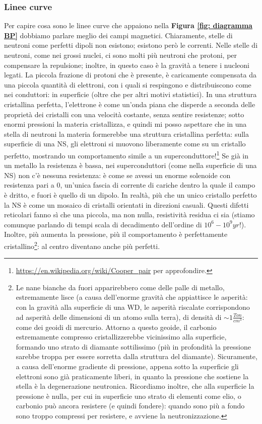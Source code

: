 \subsubsection{Linee curve}
Per capire cosa sono le linee curve che appaiono nella \textbf{Figura \ref{fig: diagramma BP}} dobbiamo parlare meglio dei campi magnetici.
Chiaramente, stelle di neutroni come perfetti dipoli non esistono; esistono però le correnti.
Nelle stelle di neutroni, come nei grossi nuclei, ci sono molti più neutroni che protoni, per compensare la repulsione; inoltre, in questo caso è la gravità a tenere i nucleoni legati.
La piccola frazione di protoni che è presente, è caricamente compensata da una piccola quantità di elettroni, con i quali si respingono e distribuiscono come nei conduttori: in superficie (oltre che per altri motivi statistici).
In una struttura cristallina perfetta, l'elettrone è come un'onda piana che disperde a seconda delle proprietà dei cristalli con una velocità costante, senza sentire resistenze; sotto enormi pressioni la materia cristallizza, e quindi mi posso aspettare che in una stella di neutroni la materia formerebbe una struttura cristallina perfetta: sulla superficie di una NS, gli elettroni si muovono liberamente come su un cristallo perfetto, mostrando un comportamento simile a un superconduttore!\footnote{\url{https://en.wikipedia.org/wiki/Cooper_pair} per approfondire.}
Se già in un metallo la resistenza è bassa, nei superconduttori (come nella superficie di una NS) non c'è nessuna resistenza: è come se avessi un enorme solenoide con resistenza pari a $0$, un'unica fascia di corrente di cariche dentro la quale il campo è dritto, e fuori è quello di un dipolo.
In realtà, più che un unico cristallo perfetto la NS è come un mosaico di cristalli orientati in direzioni casuali.
Questi difetti reticolari fanno sì che una piccola, ma non nulla, resistività residua ci sia (stiamo comunque parlando di tempi scala di decadimento dell'ordine di $10^6-10^9yr$!).
Inoltre, più aumenta la pressione, più il comportamento è perfettamente cristallino\footnote{Le nane bianche da fuori apparirebbero come delle palle di metallo, estremamente lisce (a causa dell'enorme gravità che appiattisce le asperità: con la gravità alla superficie di una WD, le asperità riscalate corrispondono ad asperità delle dimensioni di un atomo sulla terra), di densità di $\sim 1 \frac{Ton}{cm^3}$: come dei geoidi di mercurio.
Attorno a questo geoide, il carbonio estremamente compresso cristallizzerebbe vicinissimo alla superficie, formando uno strato di diamante sottilissimo (più in profondità la pressione sarebbe troppa per essere sorretta dalla struttura del diamante).
Sicuramente, a causa dell'enorme gradiente di pressione, appena sotto la superficie gli elettroni sono già praticamente liberi, in quanto la pressione che sostiene la stella è la degenerazione neutronica.
Ricordiamo inoltre, che alla superficie la pressione è nulla, per cui in superficie uno strato di elementi come elio, o carbonio può ancora resistere (e quindi fondere): quando sono più a fondo sono troppo compressi per resistere, e avviene la neutronizzazione.}: al centro diventano anche più perfetti.\vspace{3mm}\\
